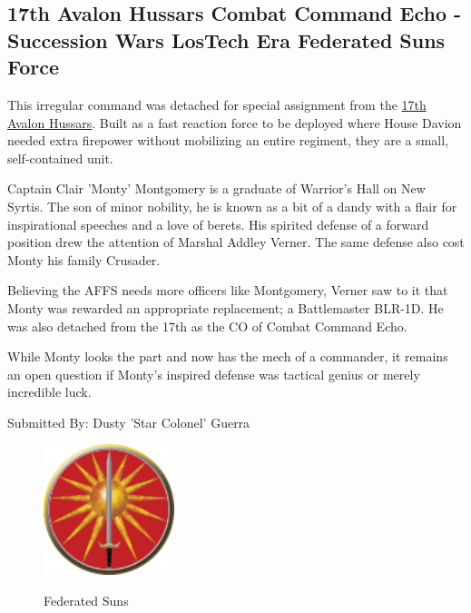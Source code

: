 \subsection{17th Avalon Hussars Combat Command Echo - Succession Wars LosTech Era Federated Suns Force}

This irregular command was detached for special assignment from the \href{https://www.sarna.net/wiki/17th_Avalon_Hussars}{17th Avalon Hussars}.
Built as a fast reaction force to be deployed where House Davion needed extra firepower without mobilizing an entire regiment, they are a small, self-contained unit.

Captain Clair 'Monty' Montgomery is a graduate of Warrior's Hall on New Syrtis.
The son of minor nobility, he is known as a bit of a dandy with a flair for inspirational speeches and a love of berets.
His spirited defense of a forward position drew the attention of Marshal Addley Verner.
The same defense also cost Monty his family Crusader.

Believing the AFFS needs more officers like Montgomery, Verner saw to it that Monty was rewarded an appropriate replacement; a Battlemaster BLR-1D.
He was also detached from the 17th as the CO of Combat Command Echo. 
 
While Monty looks the part and now has the mech of a commander, it remains an open question if Monty’s inspired defense was tactical genius or merely incredible luck.

Submitted By: Dusty 'Star Colonel' Guerra

\begin{figure}[!h]
  \centering
  \includegraphics[alt='Federated Suns Logo', width=1.5in, height=1.5in]{img/Federated-Suns.png}
  \caption*{Federated Suns}
\end{figure}

